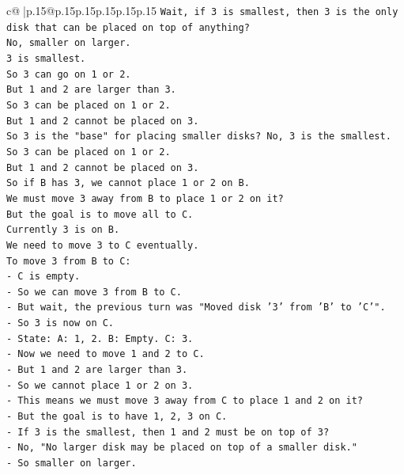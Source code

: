 \documentclass{article}
\begin{document}
{\begin{supertabular}{c@{$\;$}|p{.15\linewidth}@{}p{.15\linewidth}p{.15\linewidth}p{.15\linewidth}p{.15\linewidth}p{.15\linewidth}}
{{{\texttt{Wait, if 3 is smallest, then 3 is the only disk that can be placed on top of anything?} \\
\texttt{No, smaller on larger.} \\
\texttt{3 is smallest.} \\
\texttt{So 3 can go on 1 or 2.} \\
\texttt{But 1 and 2 are larger than 3.} \\
\texttt{So 3 can be placed on 1 or 2.} \\
\texttt{But 1 and 2 cannot be placed on 3.} \\
\texttt{So 3 is the "base" for placing smaller disks? No, 3 is the smallest.} \\
\texttt{So 3 can be placed on 1 or 2.} \\
\texttt{But 1 and 2 cannot be placed on 3.} \\
\texttt{So if B has 3, we cannot place 1 or 2 on B.} \\
\texttt{We must move 3 away from B to place 1 or 2 on it?} \\
\texttt{But the goal is to move all to C.} \\
\texttt{Currently 3 is on B.} \\
\texttt{We need to move 3 to C eventually.} \\
\texttt{To move 3 from B to C:} \\
\texttt{{-} C is empty.} \\
\texttt{{-} So we can move 3 from B to C.} \\
\texttt{{-} But wait, the previous turn was "Moved disk '3' from 'B' to 'C'".} \\
\texttt{{-} So 3 is now on C.} \\
\texttt{{-} State: A: 1, 2. B: Empty. C: 3.} \\
\texttt{{-} Now we need to move 1 and 2 to C.} \\
\texttt{{-} But 1 and 2 are larger than 3.} \\
\texttt{{-} So we cannot place 1 or 2 on 3.} \\
\texttt{{-} This means we must move 3 away from C to place 1 and 2 on it?} \\
\texttt{{-} But the goal is to have 1, 2, 3 on C.} \\
\texttt{{-} If 3 is the smallest, then 1 and 2 must be on top of 3?} \\
\texttt{{-} No, "No larger disk may be placed on top of a smaller disk."} \\
\texttt{{-} So smaller on larger.} \\
}}}
\end{supertabular}}
\end{document}
